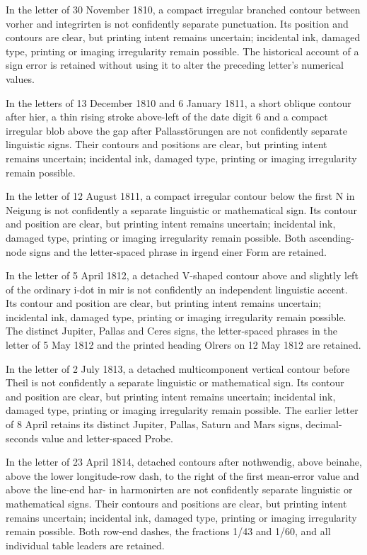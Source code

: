  In the letter of 30 November 1810, a compact irregular branched contour between vorher and integrirten is not confidently separate punctuation. Its position and contours are clear, but printing intent remains uncertain; incidental ink, damaged type, printing or imaging irregularity remain possible. The historical account of a sign error is retained without using it to alter the preceding letter’s numerical values.

In the letters of 13 December 1810 and 6 January 1811, a short oblique contour after hier, a thin rising stroke above-left of the date digit 6 and a compact irregular blob above the gap after Pallasstörungen are not confidently separate linguistic signs. Their contours and positions are clear, but printing intent remains uncertain; incidental ink, damaged type, printing or imaging irregularity remain possible.

In the letter of 12 August 1811, a compact irregular contour below the first N in Neigung is not confidently a separate linguistic or mathematical sign. Its contour and position are clear, but printing intent remains uncertain; incidental ink, damaged type, printing or imaging irregularity remain possible. Both ascending-node signs and the letter-spaced phrase in irgend einer Form are retained.

In the letter of 5 April 1812, a detached V-shaped contour above and slightly left of the ordinary i-dot in mir is not confidently an independent linguistic accent. Its contour and position are clear, but printing intent remains uncertain; incidental ink, damaged type, printing or imaging irregularity remain possible. The distinct Jupiter, Pallas and Ceres signs, the letter-spaced phrases in the letter of 5 May 1812 and the printed heading Olrers on 12 May 1812 are retained.

In the letter of 2 July 1813, a detached multicomponent vertical contour before Theil is not confidently a separate linguistic or mathematical sign. Its contour and position are clear, but printing intent remains uncertain; incidental ink, damaged type, printing or imaging irregularity remain possible. The earlier letter of 8 April retains its distinct Jupiter, Pallas, Saturn and Mars signs, decimal-seconds value and letter-spaced Probe.

In the letter of 23 April 1814, detached contours after nothwendig, above beinahe, above the lower longitude-row dash, to the right of the first mean-error value and above the line-end har- in harmonirten are not confidently separate linguistic or mathematical signs. Their contours and positions are clear, but printing intent remains uncertain; incidental ink, damaged type, printing or imaging irregularity remain possible. Both row-end dashes, the fractions 1/43 and 1/60, and all individual table leaders are retained.

